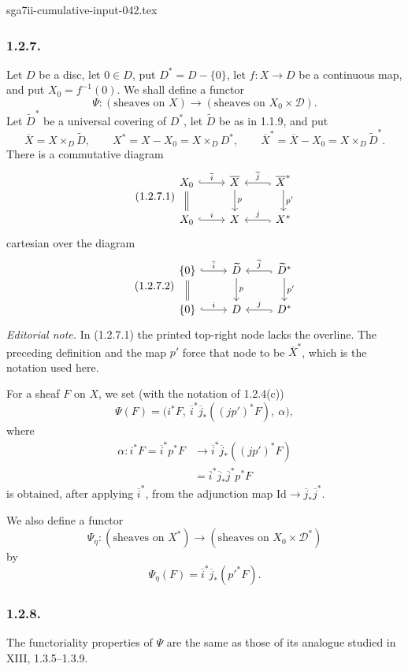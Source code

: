 \begin{filecontents*}{sga7ii-cumulative-input-042.tex}
\subsubsection*{1.2.7.}
Let $D$ be a disc, let $0\in D$, put $D^*=D-\{0\}$, let
$f:X\longrightarrow D$ be a continuous map, and put
$X_0=f^{-1}(0)$.  We shall define a functor
\[
\Psi:(\text{sheaves on }X)
\longrightarrow(\text{sheaves on }X_0\times\mathcal D).
\]
Let $\widetilde D^*$ be a universal covering of $D^*$, let
$\widetilde D$ be as in 1.1.9, and put
\[
\overline X=X\times_D\widetilde D,
\qquad
X^*=X-X_0=X\times_DD^*,
\qquad
\overline X^*=\overline X-X_0=X\times_D\widetilde D^*.
\]
There is a commutative diagram
\begin{equation}\tag{1.2.7.1}
\begin{tikzcd}
X_0 \arrow[r, hook, "\overline i"] \arrow[d, equal]
  & \overline X \arrow[d, "p"]
  & \overline X^* \arrow[l, hook, "\overline j"']
      \arrow[d, "p'"] \\
X_0 \arrow[r, hook, "i"]
  & X
  & X^* \arrow[l, hook, "j"']
\end{tikzcd}
\end{equation}
cartesian over the diagram
\begin{equation}\tag{1.2.7.2}
\begin{tikzcd}
\{0\} \arrow[r, hook, "\overline i"] \arrow[d, equal]
  & \widetilde D \arrow[d, "p"]
  & \widetilde D^* \arrow[l, hook, "\overline j"']
      \arrow[d, "p'"] \\
\{0\} \arrow[r, hook, "i"]
  & D
  & D^* \arrow[l, hook, "j"']
\end{tikzcd}
\end{equation}
\noindent\emph{Editorial note.}  In (1.2.7.1) the printed top-right
node lacks the overline.  The preceding definition and the map $p'$
force that node to be $\overline X^*$, which is the notation used
here.

For a sheaf $F$ on $X$, we set (with the notation of 1.2.4(c))
\[
\Psi(F)=
\bigl(i^*F,\ \overline i^*\overline j_*((jp')^*F),\ \alpha\bigr),
\]
where
\[
\begin{split}
\alpha:i^*F=\overline i^*p^*F
&\longrightarrow
\overline i^*\overline j_*((jp')^*F)\\
&=\overline i^*\overline j_*\overline j^*p^*F
\end{split}
\]
is obtained, after applying $\overline i^*$, from the adjunction map
$\mathrm{Id}\longrightarrow\overline j_*\overline j^*$.

We also define a functor
\[
\Psi_\eta:(\text{sheaves on }X^*)
\longrightarrow(\text{sheaves on }X_0\times\mathcal D^*)
\]
by
\[
\Psi_\eta(F)=\overline i^*\overline j_*({p'}^*F).
\]

\subsubsection*{1.2.8.}
The functoriality properties of $\Psi$ are the same as those of its
analogue studied in XIII, 1.3.5--1.3.9.

\end{filecontents*}
